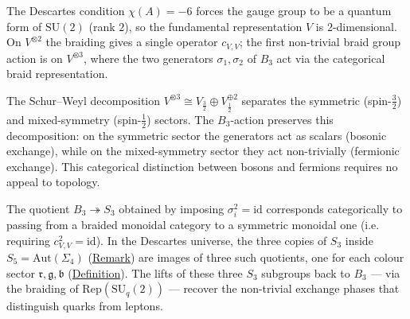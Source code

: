 \begin{remark}
  \label{rem:why-B3}
The Descartes condition $\chi(A) = -6$ forces the gauge group to be a
quantum form of $\mathrm{SU}(2)$ (rank $2$), so the fundamental
representation $V$ is $2$-dimensional.  On $V^{\otimes 2}$ the braiding
gives a single operator $c_{V,V}$; the first non-trivial braid group
action is on $V^{\otimes 3}$, where the two generators $\sigma_1, \sigma_2$
of $B_3$ act via the categorical braid representation.

The Schur--Weyl decomposition
$V^{\otimes 3} \cong V_{\frac{3}{2}} \oplus V_{\frac{1}{2}}^{\oplus 2}$
separates the symmetric (spin-$\frac{3}{2}$) and mixed-symmetry
(spin-$\frac{1}{2}$) sectors.  The $B_3$-action preserves this
decomposition: on the symmetric sector the generators act as scalars
(bosonic exchange), while on the mixed-symmetry sector they act
non-trivially (fermionic exchange).  This categorical distinction between
bosons and fermions requires no appeal to topology.
\end{remark}

\begin{remark}
  \label{rem:symmetric-quotient-colour}
The quotient $B_3 \twoheadrightarrow S_3$ obtained by imposing
$\sigma_i^2 = \mathrm{id}$ corresponds categorically to passing from a
braided monoidal category to a symmetric monoidal one (i.e. requiring
$c_{V,V}^2 = \mathrm{id}$).  In the Descartes universe, the three copies of
$S_3$ inside $S_5 = \mathrm{Aut}(\Sigma_4)$
(\hyperref[rem:chirality-trefoil]{Remark}) are images of three such quotients,
one for each colour sector $\mathfrak{r}, \mathfrak{g}, \mathfrak{b}$
(\hyperref[def:chiral-sector-coords]{Definition}).  The lifts of these three
$S_3$ subgroups back to $B_3$ --- via the braiding of
$\mathrm{Rep}(\mathrm{SU}_q(2))$ --- recover the non-trivial exchange
phases that distinguish quarks from leptons.
\end{remark}

